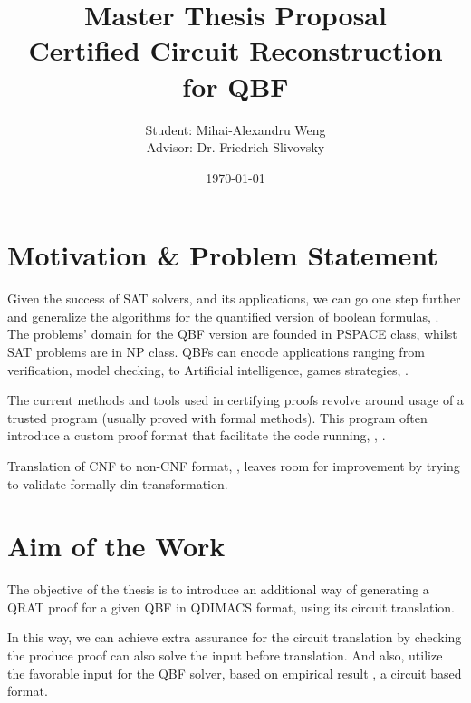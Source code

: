 \documentclass[12pt, a4paper]{article}
\title{
    \textbf{Master Thesis Proposal}\\
    Certified Circuit Reconstruction for QBF
}
\author{Student: Mihai-Alexandru Weng \\ Advisor: Dr. Friedrich Slivovsky}
\date{\today}
\begin{document}
\maketitle
\tableofcontents
\newpage

\section{Motivation \& Problem Statement}

Given the success of SAT solvers, and its applications, we can go one step further and generalize the algorithms for the quantified version of boolean formulas, \cite{biere_chapter_2021}. The problems' domain for the QBF version are founded in PSPACE class, whilst SAT problems are in NP class. QBFs can encode applications ranging from verification, model checking, to Artificial intelligence, games strategies, \cite{shukla_survey_2019}.

The current methods and tools used in certifying proofs revolve around usage of a trusted program (usually proved with formal methods). This program often introduce a custom proof format that facilitate the code running, \cite{de_moura_efficient_2017}, \cite{bryant_certified_2023}.

Translation of CNF to non-CNF format, \cite{jordan_non-cnf_nodate}, leaves room for improvement by trying to validate formally din transformation.

\newpage

\section{Aim of the Work}

The objective of the thesis is to introduce an additional way of generating a QRAT proof for a given QBF in QDIMACS format, using its circuit translation.

In this way, we can achieve extra assurance for the circuit translation by checking the produce proof can also solve the input before translation. And also, utilize the favorable input for the QBF solver, based on empirical result \cite{jordan_non-cnf_nodate}, a circuit based format.

\newpage
\end{document}
